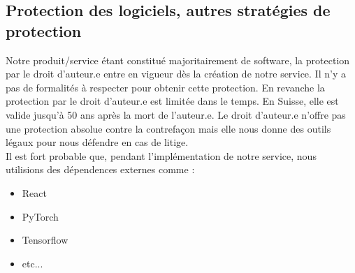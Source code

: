 %

\subsection{Protection des logiciels, autres stratégies de protection}

Notre produit/service étant constitué majoritairement de software, la protection par le droit d'auteur.e entre en vigueur dès la création de notre service. Il n'y a pas de formalités à respecter pour obtenir cette protection. En revanche la protection par le droit d'auteur.e est limitée dans le temps. En Suisse, elle est valide jusqu'à 50 ans après la mort de l'auteur.e. Le droit d'auteur.e n'offre pas une protection absolue contre la contrefaçon mais elle nous donne des outils légaux pour nous défendre en cas de litige. \\

Il est fort probable que, pendant l'implémentation de notre service, nous utilisions des dépendences externes comme :
 \begin{itemize}
     \item React
     \item PyTorch
     \item Tensorflow
     \item etc...
 \end{itemize}

